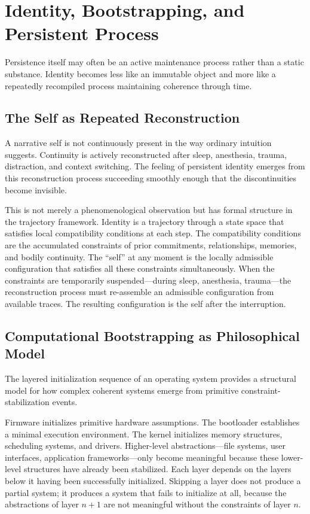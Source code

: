 \chapter{Identity, Bootstrapping, and Persistent Process}
\label{ch:identity}

\epigraph{Persistence itself may often be an active maintenance process rather
than a static substance. Identity becomes less like an immutable object and
more like a repeatedly recompiled process maintaining coherence through time.}{}

\section{The Self as Repeated Reconstruction}

A narrative self is not continuously present in the way ordinary intuition
suggests. Continuity is actively reconstructed after sleep, anesthesia, trauma,
distraction, and context switching. The feeling of persistent identity emerges
from this reconstruction process succeeding smoothly enough that the
discontinuities become invisible.

\claimP This is not merely a phenomenological observation but has formal
structure in the trajectory framework. Identity is a trajectory through a state
space that satisfies local compatibility conditions at each step. The compatibility
conditions are the accumulated constraints of prior commitments, relationships,
memories, and bodily continuity. The ``self'' at any moment is the locally
admissible configuration that satisfies all these constraints simultaneously.
When the constraints are temporarily suspended---during sleep, anesthesia,
trauma---the reconstruction process must re-assemble an admissible configuration
from available traces. The resulting configuration is the self after the
interruption.

\section{Computational Bootstrapping as Philosophical Model}

The layered initialization sequence of an operating system provides a structural
model for how complex coherent systems emerge from primitive constraint-stabilization
events.

Firmware initializes primitive hardware assumptions. The bootloader establishes
a minimal execution environment. The kernel initializes memory structures,
scheduling systems, and drivers. Higher-level abstractions---file systems,
user interfaces, application frameworks---only become meaningful because these
lower-level structures have already been stabilized. Each layer depends on the
layers below it having been successfully initialized. Skipping a layer does not
produce a partial system; it produces a system that fails to initialize at all,
because the abstractions of layer $n+1$ are not meaningful without the
constraints of layer $n$.

